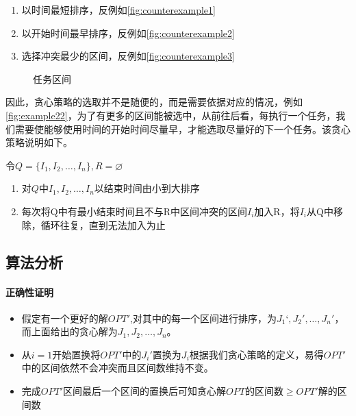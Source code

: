\begin{enumerate}
	\item 以时间最短排序，反例如\autoref{fig:counterexample1}
	\item 以开始时间最早排序，反例如\autoref{fig:counterexample2}
	\item 选择冲突最少的区间，反例如\autoref{fig:counterexample3}
\end{enumerate}


\begin{figure}[hbt!]
		\centering
	\caption{任务区间}\label{fig:example22}
\end{figure}
\newpage
因此，贪心策略的选取并不是随便的，而是需要依据对应的情况，例如\autoref{fig:example22}，为了有更多的区间能被选中，从前往后看，每执行一个任务，我们需要使能够使用时间的开始时间尽量早，才能选取尽量好的下一个任务。该贪心策略说明如下。

令$Q=\{I_1, I_2, \ldots, I_n\},R=\varnothing$

\begin{enumerate}
    \item 对$Q$中$I_1, I_2, \ldots, I_n$以结束时间由小到大排序
    \item 每次将Q中有最小结束时间且不与R中区间冲突的区间$I_i$加入R，将$I_i$从Q中移除，循环往复，直到无法加入为止
\end{enumerate}

\subsection{算法分析}
\paragraph*{正确性证明}
\begin{itemize}
    \item 假定有一个更好的解$OPT'$,对其中的每一个区间进行排序，为$J_1‘,J_2',\ldots,J_n'$，而上面给出的贪心解为$J_1,J_2,\ldots,J_n$。
    \item 从$i=1$开始置换将$OPT'$中的$J_i'置换为J_i$根据我们贪心策略的定义，易得$OPT'$中的区间依然不会冲突而且区间数维持不变。
    \item 完成$OPT'$区间最后一个区间的置换后可知贪心解$OPT$的区间数$\geq OPT'$解的区间数
\end{itemize}

